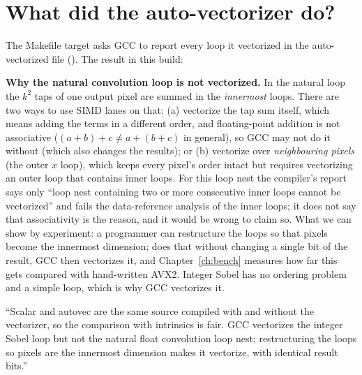 \section{What did the auto-vectorizer do?}

The Makefile target  asks GCC to report every loop it vectorized in the auto-vectorized file (). The result in this build:



\begin{plain}
\textbf{Why the natural convolution loop is not vectorized.} In the natural loop the $k^2$ taps of one output pixel are summed in the \emph{innermost} loops. There are two ways to use SIMD lanes on that: (a) vectorize the tap sum itself, which means adding the terms in a different order, and floating-point addition is not associative ($(a+b)+c\ne a+(b+c)$ in general), so GCC may not do it without  (which also changes the results); or (b) vectorize over \emph{neighbouring pixels} (the outer $x$ loop), which keeps every pixel's order intact but requires vectorizing an outer loop that contains inner loops. For this loop nest the compiler's report says only ``loop nest containing two or more consecutive inner loops cannot be vectorized'' and fails the data-reference analysis of the inner loops; it does not say that associativity is the reason, and it would be wrong to claim so. What we can show by experiment: a programmer can restructure the loops so that pixels become the innermost dimension;  does that without changing a single bit of the result, GCC then vectorizes it, and Chapter~\ref{ch:bench} measures how far this gets compared with hand-written AVX2. Integer Sobel has no ordering problem and a simple loop, which is why GCC vectorizes it.
\end{plain}

\begin{sound}
``Scalar and autovec are the same source compiled with and without the vectorizer, so the comparison with intrinsics is fair. GCC vectorizes the integer Sobel loop but not the natural float convolution loop nest; restructuring the loops so pixels are the innermost dimension makes it vectorize, with identical result bits.''
\end{sound}
